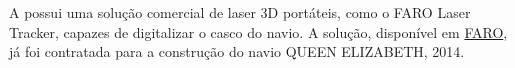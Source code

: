 

A  possui uma solução comercial de laser 3D portáteis, como
o FARO Laser Tracker, capazes de digitalizar o casco do navio. A solução, disponível em
\href{http://www.faro.com/measurement-solutions/industries/shipbuilding/2015/02/18/scanning-at-depth-three-dimensional-measurement-of-an-ocean-giant}{FARO},
já foi contratada para a construção do navio QUEEN ELIZABETH, 2014.